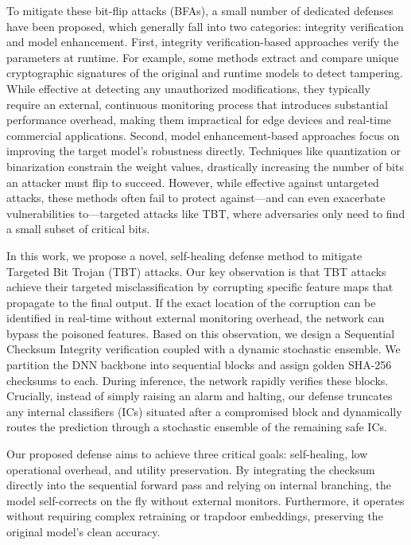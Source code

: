 \documentclass[conference]{IEEEtran}
\begin{document}

To mitigate these bit-flip attacks (BFAs), a small number of dedicated defenses have been proposed, which generally fall into two categories: integrity verification and model enhancement.
First, integrity verification-based approaches verify the parameters at runtime. For example, some methods extract and compare unique cryptographic signatures of the original and runtime models to detect tampering. While effective at detecting any unauthorized modifications, they typically require an external, continuous monitoring process that introduces substantial performance overhead, making them impractical for edge devices and real-time commercial applications.
Second, model enhancement-based approaches focus on improving the target model's robustness directly. Techniques like quantization or binarization constrain the weight values, drastically increasing the number of bits an attacker must flip to succeed. However, while effective against untargeted attacks, these methods often fail to protect against—and can even exacerbate vulnerabilities to—targeted attacks like TBT, where adversaries only need to find a small subset of critical bits.

In this work, we propose a novel, self-healing defense method to mitigate Targeted Bit Trojan (TBT) attacks. Our key observation is that TBT attacks achieve their targeted misclassification by corrupting specific feature maps that propagate to the final output. If the exact location of the corruption can be identified in real-time without external monitoring overhead, the network can bypass the poisoned features. Based on this observation, we design a Sequential Checksum Integrity verification coupled with a dynamic stochastic ensemble. We partition the DNN backbone into sequential blocks and assign golden SHA-256 checksums to each. During inference, the network rapidly verifies these blocks. Crucially, instead of simply raising an alarm and halting, our defense truncates any internal classifiers (ICs) situated after a compromised block and dynamically routes the prediction through a stochastic ensemble of the remaining safe ICs. 

Our proposed defense aims to achieve three critical goals: self-healing, low operational overhead, and utility preservation. By integrating the checksum directly into the sequential forward pass and relying on internal branching, the model self-corrects on the fly without external monitors. Furthermore, it operates without requiring complex retraining or trapdoor embeddings, preserving the original model's clean accuracy. 
\end{document}

